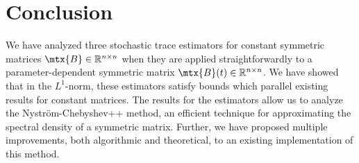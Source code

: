 \section{Conclusion}
\label{sec:conclusion}

We have analyzed three stochastic trace estimators for constant symmetric matrices $\mtx{B} \in \mathbb{R}^{n \times n}$ when they are applied straightforwardly to a parameter-dependent symmetric matrix $\mtx{B}(t) \in \mathbb{R}^{n \times n}$. We have showed that in the $L^1$-norm, these estimators satisfy bounds which parallel existing results for constant matrices. The results for the estimators allow us to analyze the Nyström-Chebyshev++ method, an efficient technique for approximating the spectral density of a symmetric matrix. Further, we have proposed multiple improvements, both algorithmic and theoretical, to an existing implementation of this method.